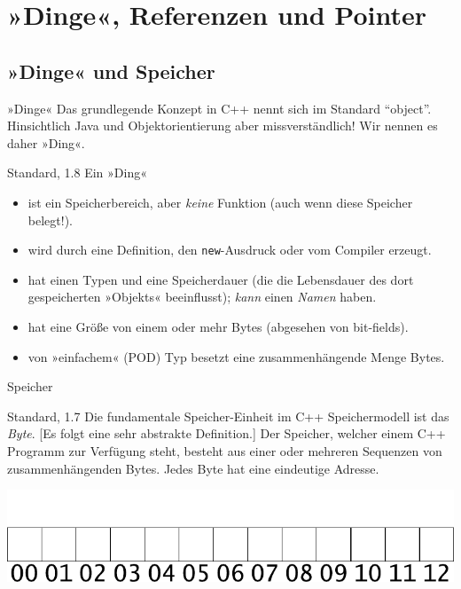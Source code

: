 \section{»Dinge«, Referenzen und Pointer}


\subsection{»Dinge« und Speicher}

\begin{frame}[fragile]{»Dinge«}
	Das grundlegende Konzept in C++ nennt sich im Standard \enquote{object}. Hinsichtlich Java und Objektorientierung aber missverständlich!
	Wir nennen es daher »Ding«.
	
	\pause
	
	\small
	\begin{block}{Standard, 1.8}
		Ein »Ding«
		\begin{itemize}
			\item ist ein Speicherbereich, aber \emph{keine} Funktion (auch wenn diese Speicher belegt!).
			\item wird durch eine Definition, den \verb|new|-Ausdruck oder vom Compiler erzeugt.
			\item hat einen Typen und eine Speicherdauer {\tiny (die die Lebensdauer des dort gespeicherten »Objekts« beeinflusst)}; \emph{kann} einen \emph{Namen} haben.
			\item hat eine Größe von einem oder mehr Bytes {\tiny (abgesehen von bit-fields)}.
			\item von »einfachem« {\tiny (POD)} Typ besetzt eine zusammenhängende Menge Bytes.
		\end{itemize}
	\end{block}
\end{frame}

\begin{frame}[fragile]{Speicher}
	\begin{block}{Standard, 1.7}
		Die fundamentale Speicher-Einheit im C++ Speichermodell ist das \emph{Byte}. [Es folgt eine sehr abstrakte Definition.]
		Der Speicher, welcher einem C++ Programm zur Verfügung steht, besteht aus einer oder mehreren Sequenzen von zusammenhängenden Bytes.
		Jedes Byte hat eine eindeutige Adresse.
	\end{block}
	
	\pause
	
	\includegraphics[width=\linewidth]{images/free}
\end{frame}

